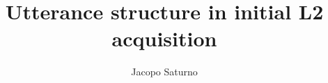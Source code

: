 \author{Jacopo Saturno} %
\title{Utterance structure in initial L2 acquisition}

\renewcommand{\lsSeries}{eurosla} %
\renewcommand{\lsSeriesNumber}{265} %



\renewcommand{\lsID}{265} %
